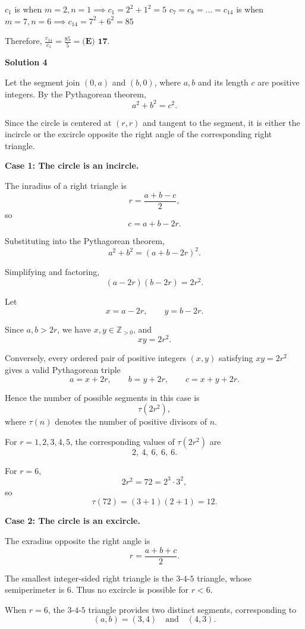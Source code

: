 \begin{enumerate}
 $c_{1}$ is when $m = 2, n = 1 \implies c_{1} = 2^2 + 1^2 = 5$
$c_{7} = c_{8} = ... = c_{14}$ is when $m = 7, n = 6 \implies c_{14} = 7^2 + 6^2 = 85$

 Therefore, $\frac{c_{14}}{c_1} = \frac{85}{5} = \boxed{\textbf{(E) 17}}$.

 


 



\textbf{Solution 4}

Let the segment join $(0,a)$ and $(b,0)$, where $a,b$ and its length $c$ are positive integers. By the Pythagorean theorem,
 \[a^2+b^2=c^2.\]

 Since the circle is centered at $(r,r)$ and tangent to the segment, it is either the incircle or the excircle opposite the right angle of the corresponding right triangle.

 \textbf{Case 1: The circle is an incircle.}

 The inradius of a right triangle is
 \[r=\frac{a+b-c}{2},\]so
 \[c=a+b-2r.\]

 Substituting into the Pythagorean theorem,
 \[a^2+b^2=(a+b-2r)^2.\]

 Simplifying and factoring,
 \[(a-2r)(b-2r)=2r^2.\]

 Let
 \[x=a-2r,\qquad y=b-2r.\]

 Since $a,b>2r$, we have $x,y\in\mathbb Z_{>0}$, and
 \[\boxed{xy=2r^2}.\]

 Conversely, every ordered pair of positive integers $(x,y)$ satisfying $xy=2r^2$ gives a valid Pythagorean triple
 \[a=x+2r,\qquad b=y+2r,\qquad c=x+y+2r.\]

 Hence the number of possible segments in this case is
 \[\tau(2r^2),\]where $\tau(n)$ denotes the number of positive divisors of $n$.

 For $r=1,2,3,4,5$, the corresponding values of $\tau(2r^2)$ are
 \[2,\ 4,\ 6,\ 6,\ 6.\]

 For $r=6$,
 \[2r^2=72=2^3\cdot3^2,\]so
 \[\tau(72)=(3+1)(2+1)=12.\]

 \textbf{Case 2: The circle is an excircle.}

 The exradius opposite the right angle is
 \[r=\frac{a+b+c}{2}.\]

 The smallest integer-sided right triangle is the $3$-$4$-$5$ triangle, whose semiperimeter is $6$. Thus no excircle is possible for $r<6$.

 When $r=6$, the $3$-$4$-$5$ triangle provides two distinct segments, corresponding to
 \[(a,b)=(3,4)\quad\text{and}\quad(4,3).\]


\end{enumerate}
